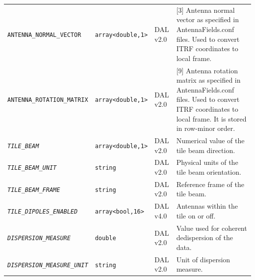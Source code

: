 \documentclass[a4paper,10pt,bibtotoc]{scrartcl}
\begin{document}
\begin{center}
\begin{supertabular}{|lllp{4.25cm}|}
    \small {\texttt{ANTENNA\_NORMAL\_VECTOR}} & \verb|array<double,1>| & DAL v2.0 & [3] Antenna normal vector as specified in AntennaFields.conf files. Used to convert ITRF coordinates to local frame.\\
    \small {\texttt{ANTENNA\_ROTATION\_MATRIX}} & \verb|array<double,1>| & DAL v2.0 & [9] Antenna rotation matrix as specified in AntennaFields.conf files. Used to convert ITRF coordinates to local frame. It is stored in row-minor order.\\
    \small \textit{\texttt{TILE\_BEAM}} & \verb|array<double,1>| & DAL v2.0 & Numerical value of the tile beam direction. \\
    \small \textit{\texttt{TILE\_BEAM\_UNIT}} & \verb|string| & DAL v2.0 & Physical units of the tile beam orientation. \\
    \small \textit{\texttt{TILE\_BEAM\_FRAME}} & \texttt{string} & DAL v2.0 & Reference frame of the tile beam.  \\
    \small \textit{\texttt{TILE\_DIPOLES\_ENABLED}} & \texttt{array<bool,16>} & DAL v4.0 & Antennas within the tile on or off.  \\
    \small \textit{\texttt{DISPERSION\_MEASURE}} & \verb|double| & DAL v2.0 & Value used for coherent dedispersion of the data. \\
    \small \textit{\texttt{DISPERSION\_MEASURE\_UNIT}} & \verb|string| & DAL v2.0 & Unit of dispersion measure.\\
    \hline
  \end{supertabular}
  \label{tab:antenna table}
\end{center}

\end{document}
